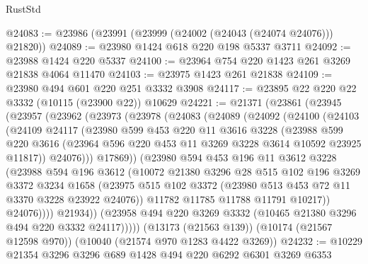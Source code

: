 \begin{lexlean}{RustStd}
\begin{coremodule}
@24083 := @23986 (@23991 (@23999 (@24002 (@24043 (@24074 @24076))) @21820))
@24089 := @23980 @1424 @618 @220 @198 @5337 @3711
@24092 := @23988 @1424 @220 @5337
@24100 := @23964 @754 @220 @1423 @261 @3269 @21838 @4064 @11470
@24103 := @23975 @1423 @261 @21838
@24109 := @23980 @494 @601 @220 @251 @3332 @3908
@24117 := @23895 @22 @220 @22 @3332 (@10115 (@23900 @22)) @10629
@24221 := @21371
    (@23861
      (@23945
        (@23957
          (@23962
            (@23973
              (@23978
                (@24083
                  (@24089
                    (@24092
                      (@24100
                        (@24103
                          (@24109
                            @24117
                            (@23980
                              @599
                              @453
                              @220
                              @11
                              @3616
                              @3228
                              (@23988
                                @599
                                @220
                                @3616
                                (@23964 @596 @220 @453 @11 @3269 @3228 @3614 @10592 @23925 @11817))
                              @24076)))
                        @17869))
                    (@23980
                      @594
                      @453
                      @196
                      @11
                      @3612
                      @3228
                      (@23988
                        @594
                        @196
                        @3612
                        (@10072
                          @21380
                          @3296
                          @28
                          @515
                          @102
                          @196
                          @3269
                          @3372
                          @3234
                          @1658
                          (@23975
                            @515
                            @102
                            @3372
                            (@23980 @513 @453 @72 @11 @3370 @3228 @23922 @24076))
                          @11782
                          @11785
                          @11788
                          @11791
                          @10217))
                      @24076))))
              @21934))
          (@23958 @494 @220 @3269 @3332 (@10465 @21380 @3296 @494 @220 @3332 @24117)))))
    (@13173 (@21563 @139))
    (@10174 (@21567 @12598 @970))
    (@10040 (@21574 @970 @1283 @4422 @3269))
@24232 := @10229 @21354 @3296 @3296 @689 @1428 @494 @220 @6292 @6301 @3269 @6353

\end{coremodule}
\end{lexlean}
